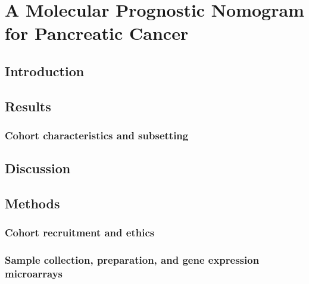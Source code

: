 \documentclass[dissertation.tex]{subfiles}
\begin{document}
\chapter{A Molecular Prognostic Nomogram for Pancreatic Cancer}
\label{chap:nomogram}

\section{Introduction}

\section{Results}
\subsection{Cohort characteristics and subsetting}
\label{subsec:nomo-results-cohort}

\section{Discussion}

\section{Methods}
\subsection{Cohort recruitment and ethics}
\label{subsec:nomo-methods-cohort}

\subsection{Sample collection, preparation, and gene expression microarrays}
\label{subsec:nomo-methods-gex}
\end{document}

